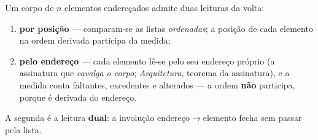 \documentclass[livro.tex]{subfiles}
\begin{document}
\begin{definicao}\label{def:leitura-endereco}
Um corpo de $n$ elementos endereçados admite duas leituras da volta:
\begin{enumerate}
\item \textbf{por posição} --- comparam-se as listas \emph{ordenadas};
a posição de cada elemento na ordem derivada participa da medida;
\item \textbf{pelo endereço} --- cada elemento lê-se pelo seu endereço
próprio (a assinatura que \emph{cavalga o corpo}; \emph{Arquitetura},
teorema da assinatura), e a medida conta faltantes, excedentes e
alterados --- a ordem \textbf{não} participa, porque é derivada do
endereço.
\end{enumerate}
A segunda é a leitura \textbf{dual}: a involução endereço$\to$elemento
fecha sem passar pela lista.
\end{definicao}
\end{document}
